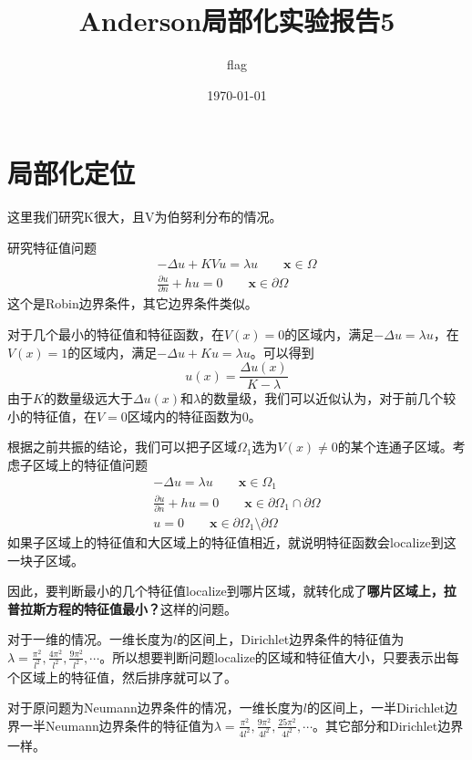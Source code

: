 \documentclass[12pt,a4paper]{article}
\title{Anderson局部化实验报告5}
\author{flag}
\date{\today}
\begin{document}
    
\maketitle

\section{局部化定位}

这里我们研究K很大，且V为伯努利分布的情况。

研究特征值问题
\begin{eqnarray}\label{e0}
-\Delta u + K V u = \lambda u \qquad \mathbf{x} \in \Omega \\
\frac{\partial u}{\partial n} + h u = 0 \qquad \mathbf{x} \in \partial \Omega
\end{eqnarray}
这个是Robin边界条件，其它边界条件类似。

对于几个最小的特征值和特征函数，在$V(x)=0$的区域内，满足$-\Delta u = \lambda u$，在$V(x)=1$的区域内，满足$-\Delta u + K u = \lambda u$。可以得到
$$ u(x) = \frac{\Delta u(x)}{K-\lambda} $$
由于$K$的数量级远大于$\Delta u(x)$和$\lambda$的数量级，我们可以近似认为，对于前几个较小的特征值，在$V=0$区域内的特征函数为0。

根据之前共振的结论，我们可以把子区域$\Omega_1$选为$V(x)\neq0$的某个连通子区域。考虑子区域上的特征值问题
\begin{eqnarray}
-\Delta u = \lambda u \qquad \mathbf{x} \in \Omega_1 \\
\frac{\partial u}{\partial n} + h u = 0 \qquad \mathbf{x} \in \partial \Omega_1 \cap \partial \Omega \\
u = 0 \qquad \mathbf{x} \in \partial \Omega_1 \setminus \partial \Omega
\end{eqnarray}
如果子区域上的特征值和大区域上的特征值相近，就说明特征函数会localize到这一块子区域。

因此，要判断最小的几个特征值localize到哪片区域，就转化成了\textbf{哪片区域上，拉普拉斯方程的特征值最小？}这样的问题。

对于一维的情况。一维长度为$l$的区间上，Dirichlet边界条件的特征值为$\lambda = \frac{\pi^2}{l^2}, \frac{4 \pi^2}{l^2}, \frac{9 \pi^2}{l^2}, \cdots $。所以想要判断问题localize的区域和特征值大小，只要表示出每个区域上的特征值，然后排序就可以了。

对于原问题为Neumann边界条件的情况，一维长度为$l$的区间上，一半Dirichlet边界一半Neumann边界条件的特征值为$\lambda = \frac{\pi^2}{4 l^2}, \frac{9 \pi^2}{4 l^2}, \frac{25 \pi^2}{4 l^2}, \cdots $。其它部分和Dirichlet边界一样。
\end{document}
